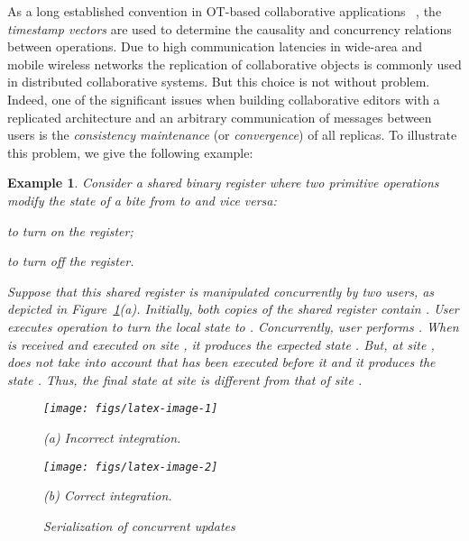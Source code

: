 \documentclass[submission,copyright,creativecommons]{eptcs}
\newtheorem{example}{Example}
\begin{document}
As a long established convention in OT-based
collaborative applications~\cite{Ellis89, Sun.ea:98}
, the
\emph{timestamp vectors} are used to determine the causality and
concurrency relations between operations.
Due to high  communication latencies in wide-area  and  mobile
wireless  networks the replication of collaborative objects is commonly
used in distributed collaborative systems. But this choice is not
without problem. Indeed, one  of the  significant  issues when  building collaborative
editors with a replicated  architecture and an arbitrary communication
of messages between users  is the \textit{consistency maintenance} (or
\textit{convergence})  of all  replicas. To  illustrate  this problem,
we give the following example:

\begin{example}\label{exmp:upDown}
Consider a shared binary register where two primitive operations modify the state of a bite from  to  and vice versa:
\begin{inparaenum}[(i)]
\item  to turn on the register;
\item  to turn off the register.
\end{inparaenum}
Suppose that this shared register is manipulated concurrently by two users, as depicted in
Figure~\ref{fig:div}(a). Initially, both copies of the shared register contain .
User     executes  operation    to turn the local state to .  Concurrently, user     performs  .   When    is  received  and
executed   on   site   ,   it  produces   the   expected   state .  But,  at  site , 
does not take  into account that  has  been executed before it
  and it produces the  state .  Thus, the final state at site
    is different  from that of  site .

\begin{figure}[h!]
\begin{minipage}[t]{0.45\linewidth}
\centerline{\texttt{[image: figs/latex-image-1]}}
\centerline{(a) Incorrect integration.}
\end{minipage}
 \hspace{.75cm}
 \begin{minipage}[t]{0.45\linewidth}
\centerline{\texttt{[image: figs/latex-image-2]}}
\centerline{(b) Correct integration.}
\end{minipage}
\caption{Serialization of concurrent updates}\label{fig:div}
\vspace{-5mm}
\end{figure}


\end{example}
\end{document}
